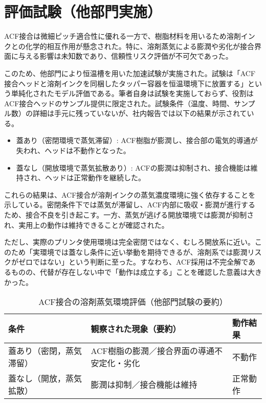 \documentclass[conference]{IEEEtran}
\begin{document}
\section{評価試験（他部門実施）}
ACF接合は微細ピッチ適合性に優れる一方で、樹脂材料を用いるため溶剤インクとの化学的相互作用が懸念された。特に、溶剤蒸気による膨潤や劣化が接合界面に与える影響は未知数であり、信頼性リスク評価が不可欠であった。  

このため、他部門により恒温槽を用いた加速試験が実施された。試験は「ACF接合ヘッドと溶剤インクを同梱したタッパー容器を恒温環境下に放置する」という単純化されたモデル評価である。筆者自身は試験を実施しておらず、役割はACF接合ヘッドのサンプル提供に限定された。試験条件（温度、時間、サンプル数）の詳細は手元に残っていないが、社内報告では以下の結果が示されている。

\begin{itemize}
 \item 蓋あり（密閉環境で蒸気滞留）: ACF樹脂が膨潤し、接合部の電気的導通が失われ、ヘッドは不動作となった。
 \item 蓋なし（開放環境で蒸気拡散あり）: ACFの膨潤は抑制され、接合機能は維持され、ヘッドは正常動作を継続した。
\end{itemize}

これらの結果は、ACF接合が溶剤インクの蒸気濃度環境に強く依存することを示している。密閉条件下では蒸気が滞留し、ACF内部に吸収・膨潤が進行するため、接合不良を引き起こす。一方、蒸気が逃げる開放環境では膨潤が抑制され、実用上の動作は維持できることが確認された。  

ただし、実際のプリンタ使用環境は完全密閉ではなく、むしろ開放系に近い。このため「実環境では蓋なし条件に近い挙動を期待できるが、溶剤系では膨潤リスクがゼロではない」という判断に至った。すなわち、ACF採用は不完全解であるものの、代替が存在しない中で「動作は成立する」ことを確認した意義は大きかった。

\begin{table}[t]
\centering
\footnotesize
\caption{ACF接合の溶剤蒸気環境評価（他部門試験の要約）}
\label{tab:solvent}
\renewcommand{\arraystretch}{1.1}
\begin{tabularx}{\columnwidth}{@{}p{2.2cm} Y p{1.9cm}@{}}
\toprule
条件 & 観察された現象（要約） & 動作結果 \\
\midrule
蓋あり（密閉，蒸気滞留） &
ACF樹脂の膨潤／接合界面の導通不安定化・劣化 &
不動作 \\
\addlinespace[2pt]
蓋なし（開放，蒸気拡散） &
膨潤は抑制／接合機能は維持 &
正常動作 \\
\bottomrule
\end{tabularx}
\end{table}
\end{document}

